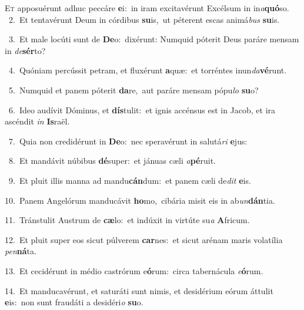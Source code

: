 \lettrine{\initial\textcolor{\initialcolor}{E}}{t} apposuérunt adhuc peccáre \textbf{e}\-i:~\star in iram excitavérunt Excélsum in in\-\textit{a}\-\textbf{quó}so.\\
{\numbfont\textcolor{\numbcolor}{~2.}}~Et tentavérunt Deum in córdibus \textbf{su}\-is,~\star ut péterent escas animá\textit{bus} \textbf{su}\-is.\par
{\numbfont\textcolor{\numbcolor}{~3.}}~Et male locúti sunt de \textbf{De}\-o:~\star dixérunt: Numquid póterit Deus paráre mensam in \textit{de}\-\textbf{sér}to?\par
{\numbfont\textcolor{\numbcolor}{~4.}}~Quóniam percússit petram, et fluxérunt \textbf{a}\-quæ:~\star et torréntes inun\-\textit{da}\-\textbf{vé}runt.\par
{\numbfont\textcolor{\numbcolor}{~5.}}~Numquid et panem póterit \textbf{da}\-re,~\star aut paráre mensam pópu\textit{lo} \textbf{su}\-o?\par
{\numbfont\textcolor{\numbcolor}{~6.}}~Ideo audívit Dóminus, et \textbf{dís}\-tulit:~\star et ignis accénsus est in Jacob, et ira ascéndit \textit{in} \textbf{Is}\-raël.\par
{\numbfont\textcolor{\numbcolor}{~7.}}~Quia non credidérunt in \textbf{De}\-o:~\star nec speravérunt in salutá\textit{ri} \textbf{e}\-jus:\par
{\numbfont\textcolor{\numbcolor}{~8.}}~Et mandávit núbibus \textbf{dé}\-super:~\star et jánuas cæli \textit{a}\-\textbf{pé}ruit.\par
{\numbfont\textcolor{\numbcolor}{~9.}}~Et pluit illis manna ad mandu\-\textbf{cán}\-dum:~\star et panem cæli de\textit{dit} \textbf{e}\-is.\par
{\numbfont\textcolor{\numbcolor}{10.}}~Panem Angelórum manducávit \textbf{ho}\-mo,~\star cibária misit eis in ab\-\textit{un}\-\textbf{dán}tia.\par
{\numbfont\textcolor{\numbcolor}{11.}}~Tránstulit Austrum de \textbf{cæ}\-lo:~\star et indúxit in virtúte su\textit{a} \textbf{A}\-fricum.\par
{\numbfont\textcolor{\numbcolor}{12.}}~Et pluit super eos sicut púlverem \textbf{car}\-nes:~\star et sicut arénam maris volatília \textit{pen}\-\textbf{ná}ta.\par
{\numbfont\textcolor{\numbcolor}{13.}}~Et cecidérunt in médio castrórum e\-\textbf{ó}\-rum:~\star circa tabernácula \textit{e}\-\textbf{ó}rum.\par
{\numbfont\textcolor{\numbcolor}{14.}}~Et manducavérunt, et saturáti sunt nimis, et desidérium eórum áttulit \textbf{e}\-is:~\star non sunt fraudáti a desidéri\textit{o} \textbf{su}\-o.\par
